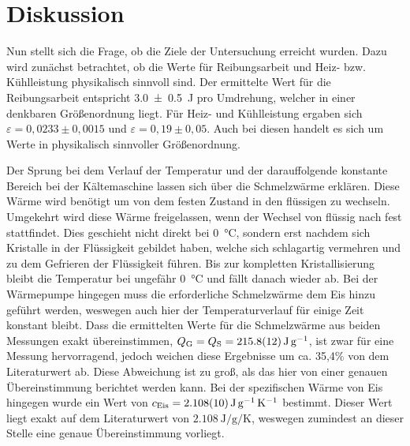 \section{Diskussion}
	
	Nun stellt sich die Frage, ob die Ziele der Untersuchung erreicht wurden.
	Dazu wird zunächst betrachtet, ob die Werte für Reibungsarbeit und Heiz- bzw. Kühlleistung physikalisch sinnvoll sind.
	Der ermittelte Wert für die Reibungsarbeit entspricht \SI{3.0+-0.5}{\joule} pro Umdrehung, welcher in einer denkbaren Größenordnung liegt.
	Für Heiz- und Kühlleistung ergaben sich $\varepsilon = 0,0233\pm 0,0015$ und $\varepsilon = 0,19\pm 0,05$.
	Auch bei diesen handelt es sich um Werte in physikalisch sinnvoller Größenordnung.
	
	Der Sprung bei dem Verlauf der Temperatur und der darauffolgende konstante Bereich bei der Kältemaschine lassen sich über die Schmelzwärme erklären.
	Diese Wärme wird benötigt um von dem festen Zustand in den flüssigen zu wechseln.
	Umgekehrt wird diese Wärme freigelassen, wenn der Wechsel von flüssig nach fest stattfindet.
	Dies geschieht nicht direkt bei \SI{0}{\celsius}, sondern erst nachdem sich Kristalle in der Flüssigkeit gebildet haben, welche sich schlagartig vermehren und zu dem Gefrieren der Flüssigkeit führen.
	Bis zur kompletten Kristallisierung bleibt die Temperatur bei ungefähr \SI{0}{\celsius} und fällt danach wieder ab.
	Bei der Wärmepumpe hingegen muss die erforderliche Schmelzwärme dem Eis hinzu geführt werden, weswegen auch hier der Temperaturverlauf für einige Zeit konstant bleibt. 
	Dass die ermittelten Werte für die Schmelzwärme aus beiden Messungen exakt übereinstimmen, $Q_\text{G} = Q_\text{S} = \SI{215.8+-1.2}{\joule\per\gram}$, ist zwar für eine Messung hervorragend, jedoch weichen diese Ergebnisse um ca. 35,4\% von dem Literaturwert\cite{Toolbox} ab.
	Diese Abweichung ist zu groß, als das hier von einer genauen Übereinstimmung berichtet werden kann.
	Bei der spezifischen Wärme von Eis hingegen wurde ein Wert von $c_\text{Eis}=\SI{2.108+-0.010}{\joule\per\gram\per\kelvin}$ bestimmt. 
	Dieser Wert liegt exakt auf dem Literaturwert\cite{Toolbox} von $\SI{2.108}{\joule\per\gram\per\kelvin}$, weswegen zumindest an dieser Stelle eine genaue Übereinstimmung vorliegt.
	